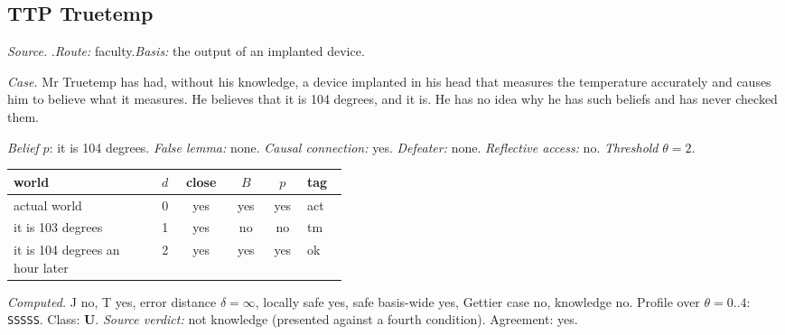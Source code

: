 \subsection*{TTP \enspace Truetemp}
\noindent\textit{Source.} \citet{Lehrer1990}.\quad \textit{Route:} faculty.\quad \textit{Basis:} the output of an implanted device.\par
\noindent\textit{Case.} Mr Truetemp has had, without his knowledge, a device implanted in his head that measures the temperature accurately and causes him to believe what it measures. He believes that it is 104 degrees, and it is. He has no idea why he has such beliefs and has never checked them.\par
\noindent\textit{Belief} $p$: it is 104 degrees.
 \textit{False lemma:} none. \textit{Causal connection:} yes. \textit{Defeater:} none. \textit{Reflective access:} no. \textit{Threshold} $\theta = 2$.\par
\begin{center}\begin{tabular}{@{}p{0.43\linewidth}rcccl@{}}
world & $d$ & close & $B$ & $p$ & tag \\ \midrule
actual world & 0 & yes & yes & yes & act \\
it is 103 degrees & 1 & yes & no & no & tm \\
it is 104 degrees an hour later & 2 & yes & yes & yes & ok \\
\end{tabular}\end{center}
\noindent\textit{Computed.} J no, T yes, error distance $\delta = \infty$, locally safe yes, safe basis-wide yes, Gettier case no, knowledge no. Profile over $\theta = 0..4$: \texttt{SSSSS}. Class: \textbf{U}.
 \textit{Source verdict:} not knowledge (presented against a fourth condition). Agreement: yes.
\par\medskip
{}
